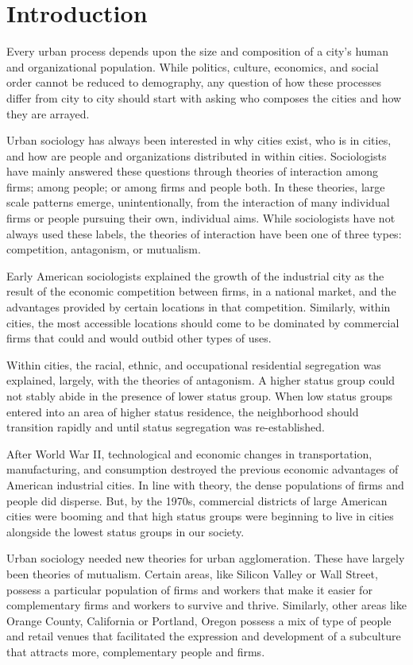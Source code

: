 \section*{Introduction}
Every urban process depends upon the size and composition of a city's
human and organizational population. While politics, culture,
economics, and social order cannot be reduced to demography, any
question of how these processes differ from city to city should start
with asking who composes the cities and how they are arrayed.

Urban sociology has always been interested in why cities exist, who is
in cities, and how are people and organizations distributed in within
cities. Sociologists have mainly answered these questions through
theories of interaction among firms; among people; or among firms and
people both. In these theories, large scale patterns emerge,
unintentionally, from the interaction of many individual firms or
people pursuing their own, individual aims.  While sociologists have
not always used these labels, the theories of interaction have been
one of three types: competition, antagonism, or mutualism.

Early American sociologists explained the growth of the industrial
city as the result of the economic competition between firms, in a
national market, and the advantages provided by certain locations in
that competition. Similarly, within cities, the most accessible
locations should come to be dominated by commercial firms that could
and would outbid other types of uses.

Within cities, the racial, ethnic, and occupational residential
segregation was explained, largely, with the theories of
antagonism. A higher status group could not stably abide in the
presence of lower status group. When low status groups entered into an
area of higher status residence, the neighborhood should transition
rapidly and until status segregation was re-established.

After World War II, technological and economic changes in
transportation, manufacturing, and consumption destroyed the previous
economic advantages of American industrial cities. In line with
theory, the dense populations of firms and people did disperse. But,
by the 1970s, commercial districts of large American cities were
booming and that high status groups were beginning to live in cities
alongside the lowest status groups in our society.

Urban sociology needed new theories for urban agglomeration. These
have largely been theories of mutualism. Certain areas, like Silicon
Valley or Wall Street, possess a particular population of firms and
workers that make it easier for complementary firms and workers to
survive and thrive. Similarly, other areas like Orange County,
California or Portland, Oregon possess a mix of type of people and
retail venues that facilitated the expression and development of a
subculture that attracts more, complementary people and firms.

